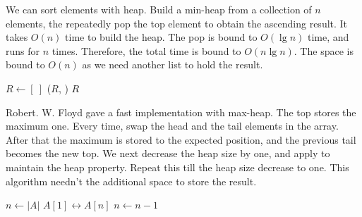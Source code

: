 \documentclass[b5paper]{article}
\begin{document}
We can sort elements with heap. Build a min-heap from a collection of $n$ elements, the repeatedly pop the top element to obtain the ascending result. It takes $O(n)$ time to build the heap. The pop is bound to $O(\lg n)$ time, and runs for $n$ times. Therefore, the total time is bound to $O(n \lg n)$. The space is bound to $O(n)$ as we need another list to hold the result.

\begin{algorithmic}[1]
  \State $R \gets [\ ]$
  \State {}
    \State {}($R$, )
  \EndWhile
  \State \Return $R$
\EndFunction
\end{algorithmic}

Robert. W. Floyd gave a fast implementation with max-heap. The top stores the maximum one. Every time, swap the head and the tail elements in the array. After that the maximum is stored to the expected position, and the previous tail becomes the new top. We next decrease the heap size by one, and apply  to maintain the heap property. Repeat this till the heap size decrease to one. This algorithm needn't the additional space to store the result.

\begin{algorithmic}[1]
  \State {}
  \State $n \gets |A|$
    \State {} $A[1] \leftrightarrow A[n]$
    \State $n \gets n - 1$
    \State {}
  \EndWhile
\EndFunction
\end{algorithmic}

\begin{Exercise}

\end{Exercise}
\end{document}

